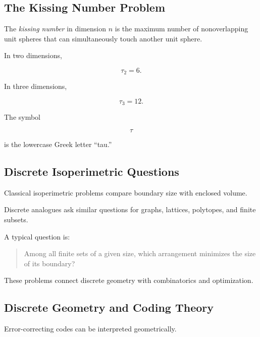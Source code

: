 \subsection{The Kissing Number Problem}
\label{subsec:kissing-number}

The \emph{kissing number} in dimension \(n\) is the maximum number of
nonoverlapping unit spheres that can simultaneously touch another unit
sphere.

In two dimensions,

\[
\boxed{
\tau_2=6.
}
\]

In three dimensions,

\[
\boxed{
\tau_3=12.
}
\]

The symbol

\[
\tau
\]

is the lowercase Greek letter ``tau.''

\subsection{Discrete Isoperimetric Questions}
\label{subsec:discrete-isoperimetric}

Classical isoperimetric problems compare boundary size with enclosed volume.

Discrete analogues ask similar questions for graphs, lattices, polytopes,
and finite subsets.

A typical question is:

\begin{quote}
Among all finite sets of a given size, which arrangement minimizes the size
of its boundary?
\end{quote}

These problems connect discrete geometry with combinatorics and optimization.

\subsection{Discrete Geometry and Coding Theory}
\label{subsec:discrete-geometry-coding}

Error-correcting codes can be interpreted geometrically.

